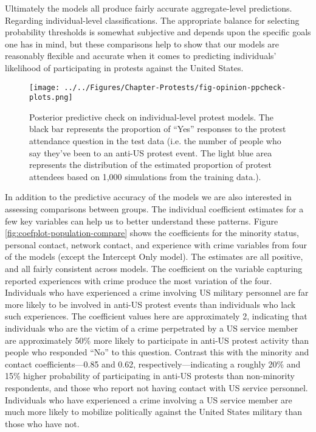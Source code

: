 Ultimately the models all produce fairly accurate aggregate-level predictions. Regarding individual-level classifications. The appropriate balance for selecting probability thresholds is somewhat subjective and depends upon the specific goals one has in mind, but these comparisons help to show that our models are reasonably flexible and accurate when it comes to predicting individuals' likelihood of participating in protests against the United States. 



\begin{figure}[t]
	\centering\texttt{[image: ../../Figures/Chapter-Protests/fig-opinion-ppcheck-plots.png]}
	\caption{Posterior predictive check on individual-level protest models. The black bar represents the proportion of ``Yes'' responses to the protest attendance question in the test data (i.e. the number of people who say they've been to an anti-US protest event. The light blue area represents the distribution of the estimated proportion of protest attendees based on 1,000 simulations from the training data.).}
	\label{fig:ppcheck-individual-protest}
\end{figure}


In addition to the predictive accuracy of the models we are also interested in assessing comparisons between groups. The individual coefficient estimates for a few key variables can help us to better understand these patterns. Figure \ref{fig:coefplot-population-compare} shows the coefficients for the minority status, personal contact, network contact, and experience with crime variables from four of the models (except the Intercept Only model). The estimates are all positive, and all fairly consistent across models. The coefficient on the variable capturing reported experiences with crime produce the most variation of the four. Individuals who have experienced a crime involving US military personnel are far more likely to be involved in anti-US protest events than individuals who lack such experiences. The coefficient values here are approximately 2, indicating that individuals who are the victim of a crime perpetrated by a US service member are approximately 50\% more likely to participate in anti-US protest activity than people who responded ``No'' to this question. Contrast this with the minority and contact coefficients---0.85 and 0.62, respectively---indicating a roughly 20\% and 15\% higher probability of participating in anti-US protests than non-minority respondents, and those who report not having contact with US service personnel. Individuals who have experienced a crime involving a US service member are much more likely to mobilize politically against the United States military than those who have not. 


